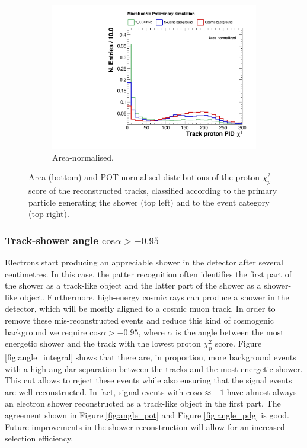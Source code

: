 \begin{figure}[htbp]
\begin{subfigure}{0.49\textwidth}
    \includegraphics[width=\linewidth]{figures/h_track_pidchipr_norm.pdf}
    \caption{Area-normalised.} \label{fig:proton_norm}
  \end{subfigure}
  \caption{Area (bottom) and POT-normalised distributions of the proton $\chi_{p}^2$ score of the reconstructed tracks, classified according to the primary particle generating the shower (top left) and to the event category (top right).}\label{fig:proton_bkg}
\end{figure}

\subsubsection*{Track-shower angle $\mathrm{cos}\alpha > -0.95$}
Electrons start producing an appreciable shower in the detector after several centimetres. In this case, the patter recognition often identifies the first part of the shower as a track-like object and the latter part of the shower as a shower-like object. 
Furthermore, high-energy cosmic rays can produce a shower in the detector, which will be mostly aligned to a cosmic muon track. In order to remove these mis-reconstructed events and reduce this kind of cosmogenic background we require $\mathrm{cos}\alpha > -0.95$, where $\alpha$ is the angle between the most energetic shower and the track with the lowest proton $\chi_{p}^2$ score.
Figure \ref{fig:angle_integral} shows that there are, in proportion, more background events with a high angular separation between the tracks and the most energetic shower. This cut allows to reject these events while also ensuring that the signal events are well-reconstructed. In fact, signal events with $\mathrm{cos}\alpha \approx -1$ have almost always an electron shower reconstructed as a track-like object in the first part. The agreement shown in Figure \ref{fig:angle_pot} and Figure \ref{fig:angle_pdg} is good. Future improvements in the shower reconstruction will allow for an increased selection efficiency.

